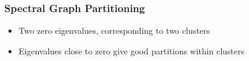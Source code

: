 \documentclass[9pt]{beamer}
\begin{document}
\begin{frame}
\frametitle{Spectral Graph Partitioning}
\label{sec-2-7}

\vspace*{-0.0cm}\begin{figure}
\end{figure}
\vspace*{-0.0cm}\begin{figure}
\end{figure}
\begin{itemize}
\item Two zero eigenvalues, corresponding to two clusters
\item Eigenvalues close to zero give good partitions within clusters
\end{itemize}
\end{frame}
\end{document}
